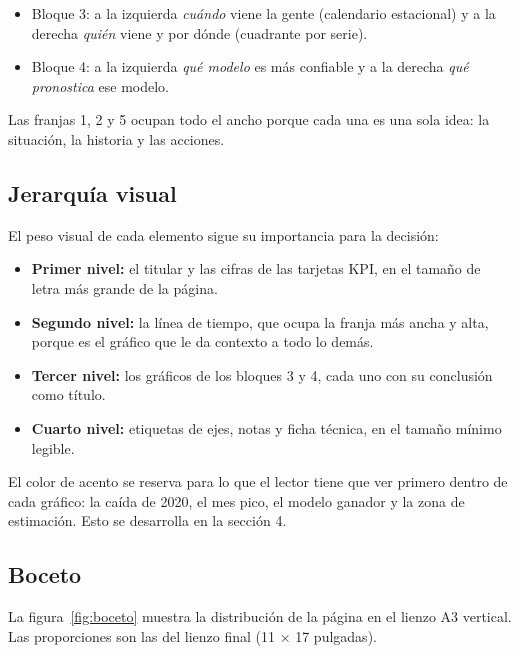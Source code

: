\begin{itemize}[leftmargin=*]
  \item Bloque 3: a la izquierda \emph{cuándo} viene la gente (calendario
  estacional) y a la derecha \emph{quién} viene y por dónde (cuadrante por serie).
  \item Bloque 4: a la izquierda \emph{qué modelo} es más confiable y a la
  derecha \emph{qué pronostica} ese modelo.
\end{itemize}

Las franjas 1, 2 y 5 ocupan todo el ancho porque cada una es una sola idea: la
situación, la historia y las acciones.

\subsection{Jerarquía visual}

El peso visual de cada elemento sigue su importancia para la decisión:

\begin{itemize}[leftmargin=*]
  \item \textbf{Primer nivel:} el titular y las cifras de las tarjetas KPI, en
  el tamaño de letra más grande de la página.
  \item \textbf{Segundo nivel:} la línea de tiempo, que ocupa la franja más
  ancha y alta, porque es el gráfico que le da contexto a todo lo demás.
  \item \textbf{Tercer nivel:} los gráficos de los bloques 3 y 4, cada uno con
  su conclusión como título.
  \item \textbf{Cuarto nivel:} etiquetas de ejes, notas y ficha técnica, en el
  tamaño mínimo legible.
\end{itemize}

El color de acento se reserva para lo que el lector tiene que ver primero dentro
de cada gráfico: la caída de 2020, el mes pico, el modelo ganador y la zona de
estimación. Esto se desarrolla en la sección 4.

\subsection{Boceto}

La figura~\ref{fig:boceto} muestra la distribución de la página en el lienzo A3
vertical. Las proporciones son las del lienzo final (11 $\times$ 17 pulgadas).

